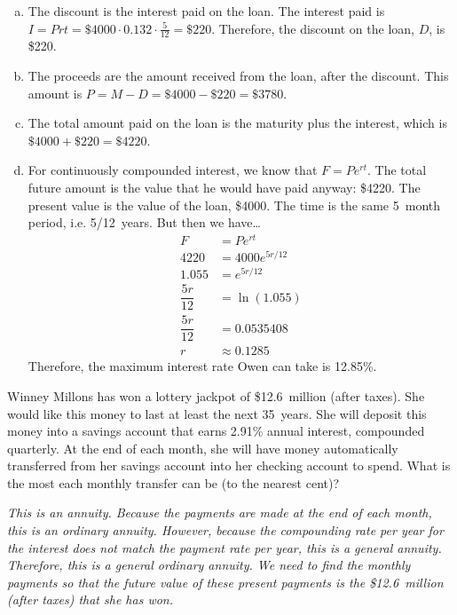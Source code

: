 \documentclass[12pt,letterpaper]{exam}
\begin{document}
\begin{questions}
{\begin{enumerate}[(a)]
\item The discount is the interest paid on the loan. The interest paid is $I= Prt= \$4000 \cdot 0.132 \cdot \frac{5}{12}= \$220$. Therefore, the discount on the loan, $D$, is \$220. \pspace

\item The proceeds are the amount received from the loan, after the discount. This amount is $P= M - D= \$4000 - \$220= \$3780$. \pspace

\item The total amount paid on the loan is the maturity plus the interest, which is $\$4000 + \$220= \$4220$. \pspace

\item For continuously compounded interest, we know that $F= Pe^{rt}$. The total future amount is the value that he would have paid anyway: \$4220. The present value is the value of the loan, \$4000. The time is the same 5~month period, i.e. 5/12~years. But then we have\dots 
	\[
	\begin{aligned}
	F&= Pe^{rt} \\[0.2cm]
	4220&= 4000 e^{5r/12} \\[0.2cm]
	1.055&= e^{5r/12} \\[0.2cm]
	\dfrac{5r}{12}&= \ln(1.055) \\[0.2cm]
	\dfrac{5r}{12}&= 0.0535408 \\[0.2cm]
	r&\approx 0.1285
	\end{aligned}
	\] \pspace
Therefore, the maximum interest rate Owen can take is 12.85\%. 
\end{enumerate}
}



\newpage
\question[10] Winney Millons has won a lottery jackpot of \$12.6~million (after taxes). She would like this money to last at least the next 35~years. She will deposit this money into a savings account that earns 2.91\% annual interest, compounded quarterly. At the end of each month, she will have money automatically transferred from her savings account into her checking account to spend. What is the most each monthly transfer can be (to the nearest cent)? \pspace

{\itshape 
\sol This is an annuity. Because the payments are made at the end of each month, this is an ordinary annuity. However, because the compounding rate per year for the interest does not match the payment rate per year, this is a general annuity. Therefore, this is a general ordinary annuity. We need to find the monthly payments so that the future value of these present payments is the \$12.6~million (after taxes) that she has won. \pspace

}
\end{questions}
\end{document}

